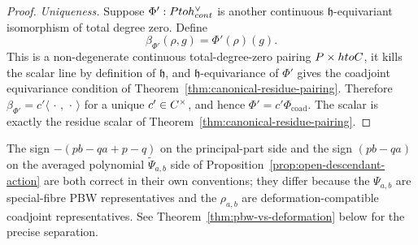 \documentclass[11pt]{memoir}
\begin{document}
\begin{proof}
  \emph{Uniqueness.} Suppose $\Phi':Ptoh^\vee_{cont}$
  is another continuous $\mathfrak h$-equivariant isomorphism of total
  degree zero. Define
  $$\beta_{\Phi'}(\rho,g)=\Phi'(\rho)(g).$$
  This is a non-degenerate continuous total-degree-zero pairing
  $P\times htoC$, it kills the scalar line by definition
  of $\mathfrak h$, and $\mathfrak h$-equivariance of $\Phi'$ gives the
  coadjoint equivariance condition of
  Theorem~\ref{thm:canonical-residue-pairing}. Therefore
  $\beta_{\Phi'}=c'\langle\,\cdot\,,\,\cdot\,\rangle$ for a unique
  $c'\in C^\times$, and hence
  $\Phi'=c'\Phi_{\mathrm{coad}}$. The scalar is exactly the residue
  scalar of Theorem~\ref{thm:canonical-residue-pairing}.
\end{proof}

\begin{rmk}\label{rmk:psi-rho-sign-convention}
  The sign $-(pb-qa+p-q)$ on the principal-part side and the sign
  $(pb-qa)$ on the averaged polynomial \(\widetilde\Psi_{a,b}\) side of
  Proposition~\ref{prop:open-descendant-action} are both correct in
  their own conventions; they differ because the $\Psi_{a,b}$ are
  special-fibre PBW representatives and the $\rho_{a,b}$ are
  deformation-compatible coadjoint representatives. See
  Theorem~\ref{thm:pbw-vs-deformation} below for the precise
  separation.
\end{rmk}
\end{document}
